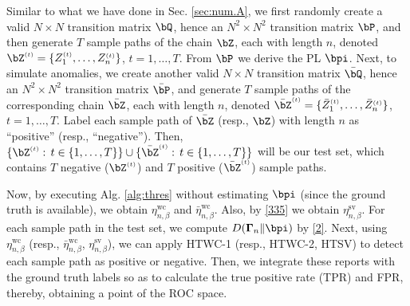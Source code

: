 \documentclass[10pt, twocolumn]{IEEEtran}
\begin{document}
{Similar to what we have done in Sec. \ref{sec:num.A}, we first randomly
create a valid $N \times N$ transition matrix $\bQ$, hence an $N^2
\times N^2$ transition matrix $\bP$, and then generate $T$ sample paths
of the chain $\bZ$, each with length $n$, denoted
${\bZ^{\scriptscriptstyle{( t )}}} = \{ {Z_1^{\scriptscriptstyle{( t
      )}}, \ldots ,Z_n^{\scriptscriptstyle{( t )}}} \}$, $t = 1, \ldots
,T$. {From $\bP$ we derive the PL $\bpi$}. Next, to simulate anomalies, we create another valid $N \times N$
transition matrix $\bar {\bQ}$, hence an $N^2 \times N^2$ transition
matrix $\bar {\bP}$, and generate $T$ sample paths of the corresponding
chain $\bar {\bZ}$, each with length $n$, denoted ${{\bar
    {\bZ}}^{\scriptscriptstyle{( t )}}} = \{ {{\bar
    Z}_1^{\scriptscriptstyle{( t )}}, \ldots ,{\bar
    Z}_n^{\scriptscriptstyle{( t )}}} \}$, $t = 1, \ldots ,T$. Label
each sample path of $\bar {\bZ}$ (resp., ${\bZ}$) with length $n$ as
``positive'' (resp., ``negative''). Then, $\{{\bZ^{\scriptscriptstyle{(
      t )}}}:\,t \in \{1,
\ldots ,T\}\} \cup \{{\bar {\bZ}}^{\scriptscriptstyle{( t )}}:\,t \in \{1,
\ldots ,T\}\}$ will be our test set, which contains $T$ negative ($\bZ^{\scriptscriptstyle{( t )}}$) and $T$ positive
(${\bar {\bZ}}^{\scriptscriptstyle{( t )}}$) sample paths.}

{Now, by executing Alg. \ref{alg:thres} without estimating $\bpi$
  (since the ground truth is available), we obtain
  $\eta_{n,\beta}^{\text{wc}}$ and $\bar
  \eta_{n,\beta}^{\text{wc}}$. Also, by \eqref{335} we obtain
  $\eta_{n,\beta}^{\text{sv}}$. For each sample path in the test set, we
  compute ${D}( {{\boldsymbol{\Gamma} _n}\| {{{\bpi}}} } )$ by
  \eqref{2}. Next, using $\eta_{n,\beta}^{\text{wc}}$ (resp., $\bar
  \eta_{n,\beta}^{\text{wc}}$, $\eta_{n,\beta}^{\text{sv}}$), we can
  apply HTWC-1 (resp., HTWC-2, HTSV) to detect each sample path as
  positive or negative. Then, we integrate these reports with the ground
  truth labels so as to calculate the true positive rate (TPR) and FPR,
  thereby, obtaining a point of the ROC space.}
\end{document}
